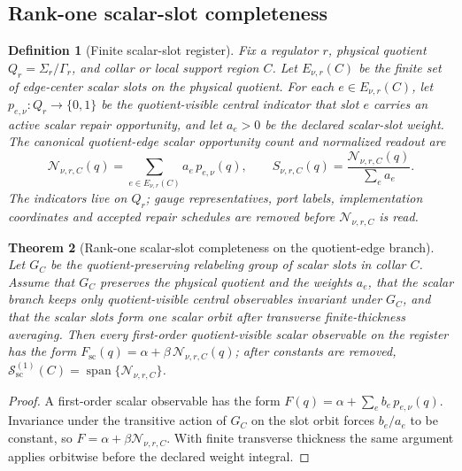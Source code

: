 \documentclass[11pt]{article}
\newtheorem{theorem}{Theorem}[section]
\newtheorem{definition}[theorem]{Definition}
\theoremstyle{remark}
\theoremstyle{plain}
\begin{document}
\subsection{Rank-one scalar-slot completeness}
\label{sec:edge-center-scalar-slot-register}

\begin{definition}[Finite scalar-slot register]\label{def:finite-scalar-slot-register}
Fix a regulator \(r\), physical quotient \(Q_r=\Sigma_r/\Gamma_r\), and collar
or local support region \(C\). Let \(E_{\nu,r}(C)\) be the finite set of
edge-center scalar slots on the physical quotient. For each
\(e\in E_{\nu,r}(C)\), let \(p_{e,\nu}:Q_r\to\{0,1\}\) be the
quotient-visible central indicator that slot \(e\) carries an active scalar
repair opportunity, and let \(a_e>0\) be the declared scalar-slot weight.
The canonical quotient-edge scalar opportunity count and normalized readout
are
\[
\mathcal N_{\nu,r,C}(q)=\sum_{e\in E_{\nu,r}(C)}a_e\,p_{e,\nu}(q),
\qquad
S_{\nu,r,C}(q)=\frac{\mathcal N_{\nu,r,C}(q)}{\sum_{e}a_e}.
\]
The indicators live on \(Q_r\); gauge representatives, port labels,
implementation coordinates and accepted repair schedules are removed before
\(\mathcal N_{\nu,r,C}\) is read.
\end{definition}

\begin{theorem}[Rank-one scalar-slot completeness on the quotient-edge branch]
\label{thm:scalar-slot-completeness}
Let \(G_C\) be the quotient-preserving relabeling group of scalar slots in
collar \(C\). Assume that \(G_C\) preserves the physical quotient and the
weights \(a_e\), that the scalar branch keeps only quotient-visible central
observables invariant under \(G_C\), and that the scalar slots form one
scalar orbit after transverse finite-thickness averaging. Then every
first-order quotient-visible scalar observable on the register has the form
\(F_{\mathrm{sc}}(q)=\alpha+\beta\,\mathcal N_{\nu,r,C}(q)\); after constants
are removed,
\(\mathcal S^{(1)}_{\mathrm{sc}}(C)=\operatorname{span}\{\mathcal N_{\nu,r,C}\}\).
\end{theorem}

\begin{proof}
A first-order scalar observable has the form
\(F(q)=\alpha+\sum_eb_e\,p_{e,\nu}(q)\). Invariance under the transitive
action of \(G_C\) on the slot orbit forces \(b_e/a_e\) to be constant, so
\(F=\alpha+\beta\mathcal N_{\nu,r,C}\). With finite transverse thickness the
same argument applies orbitwise before the declared weight integral.
\end{proof}
\end{document}
